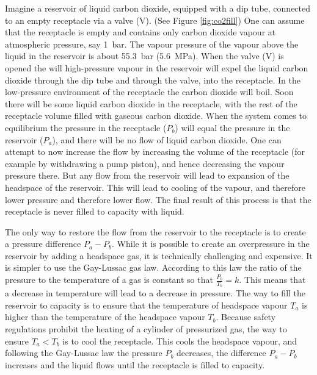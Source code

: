 Imagine a reservoir of liquid carbon dioxide, equipped with a dip tube,
connected to an empty receptacle via a valve (V). (See Figure \ref{fig:co2fill})
One can assume that the receptacle is empty and contains only carbon dioxide
vapour at atmospheric pressure, say \SI{1}{\bar}. The vapour pressure of the
vapour above the liquid in the reservoir is about \SI{55.3}{\bar}
(\SI{5.6}{\mega\pascal}). When the valve (V) is opened the will high-pressure
vapour in the reservoir will expel the liquid carbon dioxide through the dip
tube and through the valve, into the receptacle. In the low-pressure environment
of the receptacle the carbon dioxide will boil. Soon there will be some liquid
carbon dioxide in the receptacle, with the rest of the receptacle volume filled
with gaseous carbon dioxide. When the system comes to equilibrium the pressure
in the receptacle ($P_b$) will equal the pressure in the reservoir ($P_a$), and
there will be no flow of liquid carbon dioxide. One can attempt to now increase
the flow by increasing the volume of the receptacle (for example by withdrawing
a pump piston), and hence decreasing the vapour pressure there. But any flow
from the reservoir will lead to expansion of the headspace of the reservoir.
This will lead to cooling of the vapour, and therefore lower pressure and
therefore lower flow. The final result of this process is that the receptacle is
never filled to capacity with liquid.

The only way to restore the flow from the reservoir to the receptacle is to
create a pressure difference $P_a - P_b$. While it is possible to create an
overpressure in the reservoir by adding a headspace gas, it is technically
challenging and expensive. It is simpler to use the Gay-Lussac gas law.
According to this law the ratio of the pressure to the temperature of a gas is
constant so that $\frac{P_b}{T_b} = k$. This means that a decrease in
temperature will lead to a decrease in pressure. The way to fill the reservoir
to capacity is to ensure that the temperature of headspace vapour $T_a$ is higher
than the temperature of the headspace vapour $T_b$. Because safety regulations
prohibit the heating of a cylinder of pressurized gas, the way to ensure $T_a <
T_b$ is to cool the receptacle. This cools the headspace vapour, and following
the Gay-Lussac law the pressure $P_b$ decreases, the difference $P_a - P_b$
increases and the liquid flows until the receptacle is filled to capacity.
 
